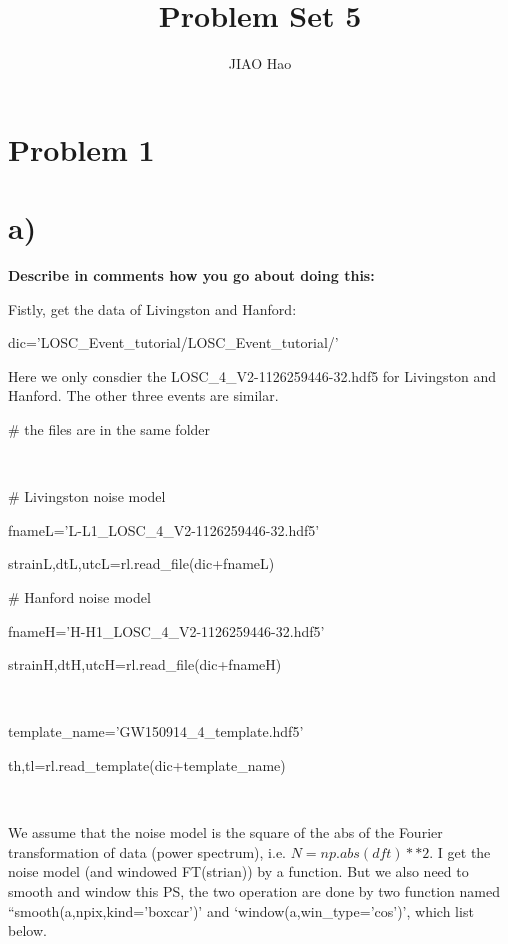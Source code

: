 \documentclass[showpacs, oneside, onecolumn, prl, amsmath, amssymb, nofootinbib, superscriptaddress, notitlepage]{revtex4-1}
\begin{document}
	
\title{Problem Set 5}


\author{JIAO Hao}




\maketitle

\section{Problem 1}

\section{a)}

\textbf{Describe in comments how you go about doing this:}

Fistly, get the data of Livingston and Hanford:

{\color{gray}

dic='LOSC\_Event\_tutorial/LOSC\_Event\_tutorial/'}

Here we only consdier the LOSC\_4\_V2-1126259446-32.hdf5 for Livingston and Hanford. The other three events are similar.

{\color{gray}

\# the files are in the same folder

~~~~

\# Livingston noise model

fnameL='L-L1\_LOSC\_4\_V2-1126259446-32.hdf5'

strainL,dtL,utcL=rl.read\_file(dic+fnameL)

\# Hanford noise model

fnameH='H-H1\_LOSC\_4\_V2-1126259446-32.hdf5'

strainH,dtH,utcH=rl.read\_file(dic+fnameH)

~~~~

template\_name='GW150914\_4\_template.hdf5'

th,tl=rl.read\_template(dic+template\_name)

~~~~}

We assume that the noise model is the square of the abs of the Fourier transformation of data (power spectrum), i.e. $N=np.abs(dft)**2$. I get the noise model (and windowed FT(strian)) by a function. But we also need to smooth and window this PS, the two operation are done by two function named ``smooth(a,npix,kind='boxcar')' and `window(a,win\_type='cos')', which list below.
\end{document}
